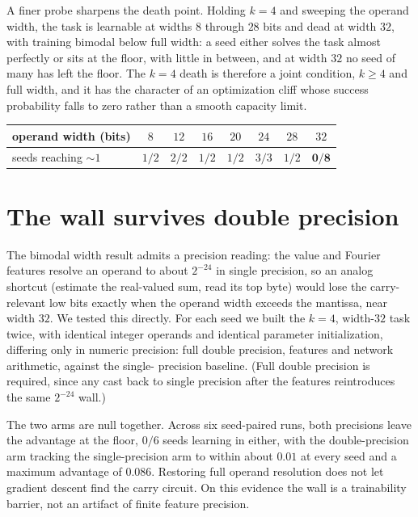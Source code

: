\documentclass[11pt]{article}
\begin{document}
A finer probe sharpens the death point. Holding $k=4$ and sweeping the
operand width, the task is learnable at widths $8$ through $28$ bits and
dead at width $32$, with training bimodal below full width: a seed either
solves the task almost perfectly or sits at the floor, with little in
between, and at width $32$ no seed of many has left the floor. The $k=4$
death is therefore a joint condition, $k\ge4$ and full width, and it has
the character of an optimization cliff whose success probability falls to
zero rather than a smooth capacity limit.

\begin{center}
\begin{tabular}{lccccccc}
\hline
operand width (bits) & $8$ & $12$ & $16$ & $20$ & $24$ & $28$ & $32$\\
\hline
seeds reaching ${\sim}1$ & $1/2$ & $2/2$ & $1/2$ & $1/2$ & $3/3$ & $1/2$ & $\mathbf{0/8}$\\
\hline
\end{tabular}
\end{center}

\section{The wall survives double precision}\label{sec:float}

The bimodal width result admits a precision reading: the value and Fourier
features resolve an operand to about $2^{-24}$ in single precision, so an
analog shortcut (estimate the real-valued sum, read its top byte) would
lose the carry-relevant low bits exactly when the operand width exceeds the
mantissa, near width $32$. We tested this directly. For each seed we built
the $k=4$, width-$32$ task twice, with identical integer operands and
identical parameter initialization, differing only in numeric precision:
full double precision, features and network arithmetic, against the single-
precision baseline. (Full double precision is required, since any cast back
to single precision after the features reintroduces the same $2^{-24}$
wall.)

The two arms are null together. Across six seed-paired runs, both
precisions leave the advantage at the floor, $0/6$ seeds learning in
either, with the double-precision arm tracking the single-precision arm to
within about $0.01$ at every seed and a maximum advantage of $0.086$.
Restoring full operand resolution does not let gradient descent find the
carry circuit. On this evidence the wall is a trainability barrier, not an
artifact of finite feature precision.
\end{document}

